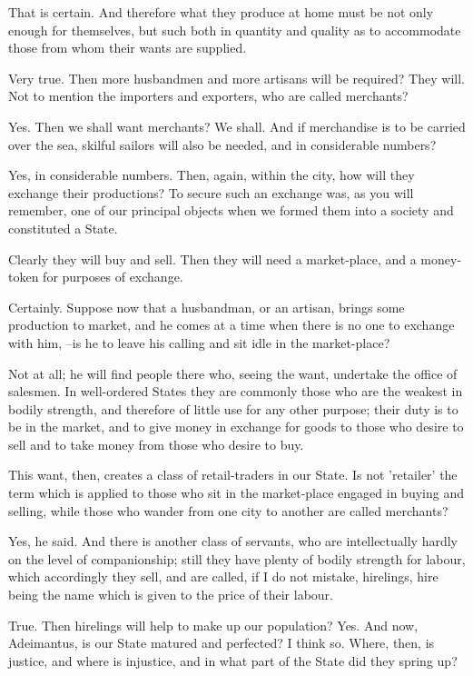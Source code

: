 That is certain.
And therefore what they produce at home must be not only enough for themselves, but such both in quantity and quality as to accommodate those from whom their wants are supplied.

Very true.
Then more husbandmen and more artisans will be required?
They will.
Not to mention the importers and exporters, who are called merchants?

Yes.
Then we shall want merchants?
We shall.
And if merchandise is to be carried over the sea, skilful sailors will also be needed, and in considerable numbers?

Yes, in considerable numbers.
Then, again, within the city, how will they exchange their productions? To secure such an exchange was, as you will remember, one of our principal objects when we formed them into a society and constituted a State.

Clearly they will buy and sell.
Then they will need a market-place, and a money-token for purposes of exchange.

Certainly.
Suppose now that a husbandman, or an artisan, brings some production to market, and he comes at a time when there is no one to exchange with him, --is he to leave his calling and sit idle in the market-place?

Not at all; he will find people there who, seeing the want, undertake the office of salesmen. In well-ordered States they are commonly those who are the weakest in bodily strength, and therefore of little use for any other purpose; their duty is to be in the market, and to give money in exchange for goods to those who desire to sell and to take money from those who desire to buy.

This want, then, creates a class of retail-traders in our State. Is not 'retailer' the term which is applied to those who sit in the market-place engaged in buying and selling, while those who wander from one city to another are called merchants?

Yes, he said.
And there is another class of servants, who are intellectually hardly on the level of companionship; still they have plenty of bodily strength for labour, which accordingly they sell, and are called, if I do not mistake, hirelings, hire being the name which is given to the price of their labour.

True.
Then hirelings will help to make up our population?
Yes.
And now, Adeimantus, is our State matured and perfected?
I think so.
Where, then, is justice, and where is injustice, and in what part of the State did they spring up?


